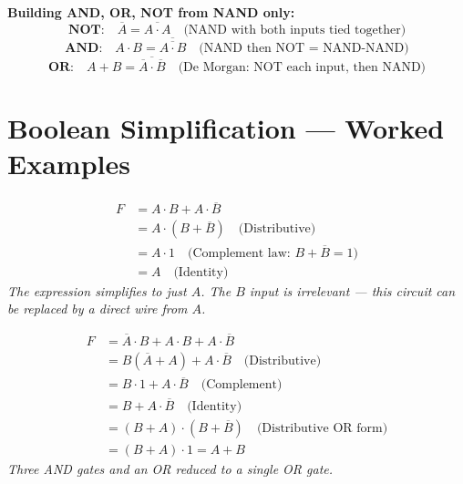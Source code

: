 \documentclass[11pt, letterpaper]{article}
\begin{document}
\textbf{Building AND, OR, NOT from NAND only:}
\[
  \textbf{NOT:}\quad \overline{A} = \overline{A \cdot A} \quad\text{(NAND with both inputs tied together)}
\]
\[
  \textbf{AND:}\quad A \cdot B = \overline{\overline{A \cdot B}} \quad\text{(NAND then NOT = NAND-NAND)}
\]
\[
  \textbf{OR:}\quad A + B = \overline{\overline{A} \cdot \overline{B}} \quad\text{(De Morgan: NOT each input, then NAND)}
\]

\section*{Boolean Simplification --- Worked Examples}

\begin{tcolorbox}[colback=part4bg, colframe=sectionorange,
  title={\bfseries Example 1: Simplify $F = A\cdot B + A\cdot\overline{B}$}, arc=3pt, boxrule=1pt]
\begin{align*}
  F &= A\cdot B + A\cdot\overline{B} \\
    &= A\cdot(B + \overline{B}) \quad\text{(Distributive)} \\
    &= A \cdot 1               \quad\text{(Complement law: $B + \overline{B} = 1$)} \\
    &= A                        \quad\text{(Identity)}
\end{align*}
\textit{The expression simplifies to just $A$. The $B$ input is irrelevant --- this circuit can be replaced by a direct wire from $A$.}
\end{tcolorbox}

\begin{tcolorbox}[colback=part4bg, colframe=sectionorange,
  title={\bfseries Example 2: Simplify $F = \overline{A}\cdot B + A\cdot B + A\cdot\overline{B}$}, arc=3pt, boxrule=1pt]
\begin{align*}
  F &= \overline{A}\cdot B + A\cdot B + A\cdot\overline{B} \\
    &= B(\overline{A} + A) + A\cdot\overline{B}            \quad\text{(Distributive)} \\
    &= B\cdot 1 + A\cdot\overline{B}                       \quad\text{(Complement)} \\
    &= B + A\cdot\overline{B}                              \quad\text{(Identity)} \\
    &= (B + A)\cdot(B + \overline{B})                      \quad\text{(Distributive OR form)} \\
    &= (B + A)\cdot 1 = A + B
\end{align*}
\textit{Three AND gates and an OR reduced to a single OR gate.}
\end{tcolorbox}
\end{document}
